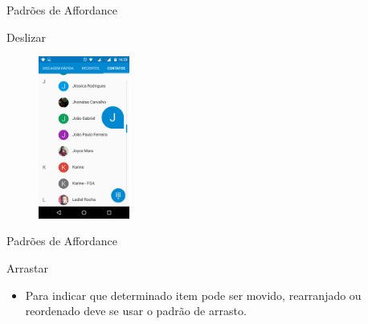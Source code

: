 \begin{frame}{Padrões de Affordance}
\begin{block}{Deslizar}
    \begin{figure}
    \includegraphics[width=3cm]{figuras/deslize/deslize5}
    \end{figure}
\end{block}
\end{frame}

\begin{frame}{Padrões de Affordance}
\begin{block}{Arrastar}
  \begin{itemize}
    \item<1-> Para indicar que determinado item pode ser movido, rearranjado ou reordenado deve se usar o padrão de arrasto.
  \end{itemize}
\end{block}
\end{frame}
